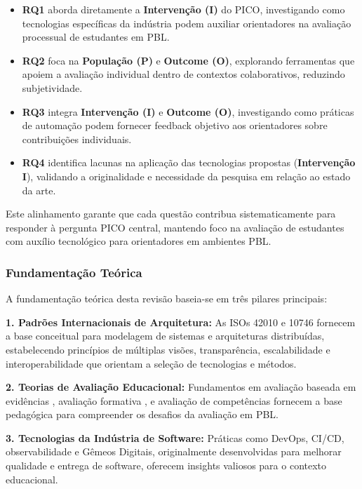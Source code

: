 \documentclass[english, spanish, brazilian]{RBIEarticle} %
\begin{document}
\begin{itemize}
\item \textbf{RQ1} aborda diretamente a \textbf{Intervenção (I)} do PICO, investigando como tecnologias específicas da indústria podem auxiliar orientadores na avaliação processual de estudantes em PBL.

\item \textbf{RQ2} foca na \textbf{População (P)} e \textbf{Outcome (O)}, explorando ferramentas que apoiem a avaliação individual dentro de contextos colaborativos, reduzindo subjetividade.

\item \textbf{RQ3} integra \textbf{Intervenção (I)} e \textbf{Outcome (O)}, investigando como práticas de automação podem fornecer feedback objetivo aos orientadores sobre contribuições individuais.

\item \textbf{RQ4} identifica lacunas na aplicação das tecnologias propostas (\textbf{Intervenção I}), validando a originalidade e necessidade da pesquisa em relação ao estado da arte.
\end{itemize}

Este alinhamento garante que cada questão contribua sistematicamente para responder à pergunta PICO central, mantendo foco na avaliação de estudantes com auxílio tecnológico para orientadores em ambientes PBL.

\subsubsection{Fundamentação Teórica}

A fundamentação teórica desta revisão baseia-se em três pilares principais:

\textbf{1. Padrões Internacionais de Arquitetura:} As ISOs 42010 e 10746 fornecem a base conceitual para modelagem de sistemas e arquiteturas distribuídas, estabelecendo princípios de múltiplas visões, transparência, escalabilidade e interoperabilidade que orientam a seleção de tecnologias e métodos.

\textbf{2. Teorias de Avaliação Educacional:} Fundamentos em avaliação baseada em evidências \parencite{Mislevy2003}, avaliação formativa \parencite{Stiggins2005}, e avaliação de competências \parencite{Pellegrino2001} fornecem a base pedagógica para compreender os desafios da avaliação em PBL.

\textbf{3. Tecnologias da Indústria de Software:} Práticas como DevOps, CI/CD, observabilidade e Gêmeos Digitais, originalmente desenvolvidas para melhorar qualidade e entrega de software, oferecem insights valiosos para o contexto educacional.
\end{document}
